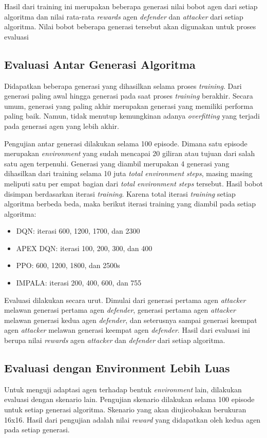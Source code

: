 Hasil dari training ini merupakan beberapa generasi nilai bobot agen dari setiap algoritma dan nilai rata-rata \emph{rewards}
agen \emph{defender} dan \emph{attacker} dari setiap algoritma.
Nilai bobot beberapa generasi tersebut akan digunakan untuk proses evaluasi

\subsection{Evaluasi Antar Generasi Algoritma}
Didapatkan beberapa generasi yang dihasilkan selama proses \emph{training}. 
Dari generasi paling awal hingga generasi pada saat proses \emph{training} berakhir.
Secara umum, generasi yang paling akhir merupakan generasi yang memiliki performa paling baik.
Namun, tidak menutup kemungkinan adanya \emph{overfitting} yang terjadi pada generasi agen yang lebih akhir.

Pengujian antar generasi dilakukan selama 100 episode.
Dimana satu episode merupakan \emph{environment} yang sudah mencapai 20 giliran atau tujuan dari salah satu agen terpenuhi.
Generasi yang diambil merupakan 4 generasi yang dihasilkan dari training selama 10 juta \emph{total environment steps},
masing masing meliputi satu per empat bagian dari \emph{total environment steps} tersebut.
Hasil bobot disimpan berdasarkan iterasi \emph{training}.
Karena total iterasi \emph{training} setiap algoritma berbeda beda, maka berikut iterasi training yang diambil pada setiap algoritma:
\begin{itemize}
  \item DQN: iterasi 600, 1200, 1700, dan 2300
  \item APEX DQN: iterasi 100, 200, 300, dan 400
  \item PPO: 600, 1200, 1800, dan 2500s
  \item IMPALA: iterasi 200, 400, 600, dan 755
\end{itemize}

Evaluasi dilakukan secara urut. 
Dimulai dari generasi pertama agen \emph{attacker} melawan generasi pertama agen \emph{defender},
generasi pertama agen \emph{attacker} melawan generasi kedua agen \emph{defender}, 
dan seterusnya sampai generasi keempat agen \emph{attacker} melawan generasi keempat agen \emph{defender}.
Hasil dari evaluasi ini berupa nilai \emph{rewards} agen \emph{attacker} dan \emph{defender} dari setiap algoritma.

\subsection{Evaluasi dengan Environment Lebih Luas}
Untuk menguji adaptasi agen terhadap bentuk \emph{environment} lain, dilakukan evaluasi dengan skenario lain. 
Pengujian skenario dilakukan selama 100 episode untuk setiap generasi algoritma.
Skenario yang akan diujicobakan berukuran 16x16. 
Hasil dari pengujian adalah nilai \emph{reward} yang didapatkan oleh kedua agen pada setiap generasi.

